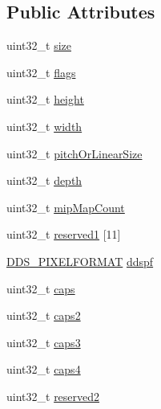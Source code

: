 \subsection*{Public Attributes}
\begin{DoxyCompactItemize}
\item 
uint32\+\_\+t \hyperlink{struct_d_d_s___h_e_a_d_e_r_a989502ea402a8e5939395a6b98ae9ce0_a989502ea402a8e5939395a6b98ae9ce0}{size}
\item 
uint32\+\_\+t \hyperlink{struct_d_d_s___h_e_a_d_e_r_a418e512458f8f02ac5102993095a2aa3_a418e512458f8f02ac5102993095a2aa3}{flags}
\item 
uint32\+\_\+t \hyperlink{struct_d_d_s___h_e_a_d_e_r_a550dc15efb086708b8eac1bfebd2e617_a550dc15efb086708b8eac1bfebd2e617}{height}
\item 
uint32\+\_\+t \hyperlink{struct_d_d_s___h_e_a_d_e_r_a2a0b8bcd7ee4d2f097c0216c8d2c2df1_a2a0b8bcd7ee4d2f097c0216c8d2c2df1}{width}
\item 
uint32\+\_\+t \hyperlink{struct_d_d_s___h_e_a_d_e_r_a77410ea1d2209672fc6651b5322a9306_a77410ea1d2209672fc6651b5322a9306}{pitch\+Or\+Linear\+Size}
\item 
uint32\+\_\+t \hyperlink{struct_d_d_s___h_e_a_d_e_r_aa5b6801b932296cdfdc1651310c00c9b_aa5b6801b932296cdfdc1651310c00c9b}{depth}
\item 
uint32\+\_\+t \hyperlink{struct_d_d_s___h_e_a_d_e_r_a17b6d75171143338b022406db274cdb3_a17b6d75171143338b022406db274cdb3}{mip\+Map\+Count}
\item 
uint32\+\_\+t \hyperlink{struct_d_d_s___h_e_a_d_e_r_a589e935e11a1d8193101741109710319_a589e935e11a1d8193101741109710319}{reserved1} \mbox{[}11\mbox{]}
\item 
\hyperlink{struct_d_d_s___p_i_x_e_l_f_o_r_m_a_t}{D\+D\+S\+\_\+\+P\+I\+X\+E\+L\+F\+O\+R\+M\+AT} \hyperlink{struct_d_d_s___h_e_a_d_e_r_a27445ea81444c05a620469f266bff154_a27445ea81444c05a620469f266bff154}{ddspf}
\item 
uint32\+\_\+t \hyperlink{struct_d_d_s___h_e_a_d_e_r_abe6a0e77831687e848375587e992046a_abe6a0e77831687e848375587e992046a}{caps}
\item 
uint32\+\_\+t \hyperlink{struct_d_d_s___h_e_a_d_e_r_aaeb2d711eeae0d04523ef4786a1120fa_aaeb2d711eeae0d04523ef4786a1120fa}{caps2}
\item 
uint32\+\_\+t \hyperlink{struct_d_d_s___h_e_a_d_e_r_a922da2c168f35e78ba99fe7d4350b422_a922da2c168f35e78ba99fe7d4350b422}{caps3}
\item 
uint32\+\_\+t \hyperlink{struct_d_d_s___h_e_a_d_e_r_a82a00dd554e8212cb5a002b1970b225c_a82a00dd554e8212cb5a002b1970b225c}{caps4}
\item 
uint32\+\_\+t \hyperlink{struct_d_d_s___h_e_a_d_e_r_a2b94becd3bfcb64930551d3bb4387198_a2b94becd3bfcb64930551d3bb4387198}{reserved2}
\end{DoxyCompactItemize}


